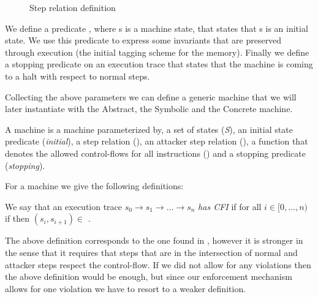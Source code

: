 \begin{figure}[htb!]
\centering
\begin{minipage}[b]{0.25\linewidth}
\centering
{}
\label{fig:step_stepn}
\end{minipage}
\hspace{0.5cm}
\begin{minipage}[b]{0.15\linewidth}
\centering
{}
\label{fig:step_stepa}
\end{minipage}
\caption{Step relation definition}
\end{figure}

We define a predicate , where s is a machine state, that
states that s is an initial state. We use this predicate to express some
invariants that are preserved through execution (\EG the initial tagging scheme
for the memory). Finally we define a stopping predicate on an execution trace
that states that the machine is coming to a halt with respect to normal steps.

Collecting the above parameters we can define a generic \CFI machine
that we will later instantiate with the Abstract, the Symbolic and the
Concrete machine.

\begin{definition}
\label{cfi_machine}
A \CFI machine is a machine parameterized by, a set of states
(\textit{S}), an initial state predicate (\textit{initial}), a step
relation (\stepn{}{}), an attacker step relation (\stepa{}{}{}), a
function that denotes the allowed control-flows for all instructions
(\SUCC{}) and a stopping predicate (\textit{stopping}).
\end{definition}

For a \CFI machine we give the following definitions:

\begin{definition}\label{traceHasCfi}
  We say that an execution trace $s_0 \to s_1 \to \ldots \to s_n$ {\em has CFI}
  if for all $ i \in [0,\ldots,n)$ if  then
  $(s_i,s_{i+1}) \in$ \SUCC{}.
\end{definition}


The above definition corresponds to the one found in \cite{AbadiBEL09}, however
it is stronger in the sense that it requires that steps that are in the
intersection of normal and attacker steps respect the control-flow. If we did
not allow for any violations then the above definition would be enough, but
since our enforcement mechanism allows for one violation we have to resort to a
weaker definition.

